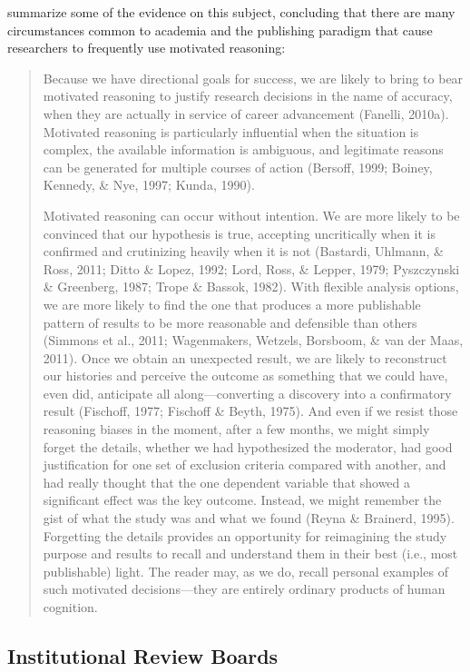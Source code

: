 \documentclass[12pt] {article}
\begin{document}
\cite{nosek_scientific_2012} summarize some of the evidence on this
subject, concluding that there are many circumstances common to academia
and the publishing paradigm that cause researchers to frequently use
motivated reasoning:

\begin{quote}
Because we have directional goals for success, we are likely to bring to
bear motivated reasoning to justify research decisions in the name of
accuracy, when they are actually in service of career advancement
(Fanelli, 2010a). Motivated reasoning is particularly influential when
the situation is complex, the available information is ambiguous, and
legitimate reasons can be generated for multiple courses of action
(Bersoff, 1999; Boiney, Kennedy, \& Nye, 1997; Kunda, 1990).

Motivated reasoning can occur without intention. We are more likely to
be convinced that our hypothesis is true, accepting uncritically when it
is confirmed and crutinizing heavily when it is not (Bastardi, Uhlmann,
\& Ross, 2011; Ditto \& Lopez, 1992; Lord, Ross, \& Lepper, 1979;
Pyszczynski \& Greenberg, 1987; Trope \& Bassok, 1982). With flexible
analysis options, we are more likely to find the one that produces a
more publishable pattern of results to be more reasonable and defensible
than others (Simmons et al., 2011; Wagenmakers, Wetzels, Borsboom, \&
van der Maas, 2011). Once we obtain an unexpected result, we are likely
to reconstruct our histories and perceive the outcome as something that
we could have, even did, anticipate all along---converting a discovery
into a confirmatory result (Fischoff, 1977; Fischoff \& Beyth, 1975).
And even if we resist those reasoning biases in the moment, after a few
months, we might simply forget the details, whether we had hypothesized
the moderator, had good justification for one set of exclusion criteria
compared with another, and had really thought that the one dependent
variable that showed a significant effect was the key outcome. Instead,
we might remember the gist of what the study was and what we found
(Reyna \& Brainerd, 1995). Forgetting the details provides an
opportunity for reimagining the study purpose and results to recall and
understand them in their best (i.e., most publishable) light. The reader
may, as we do, recall personal examples of such motivated
decisions---they are entirely ordinary products of human cognition.
\end{quote}

\subsection{Institutional Review
Boards}\label{institutional-review-boards}
\end{document}
